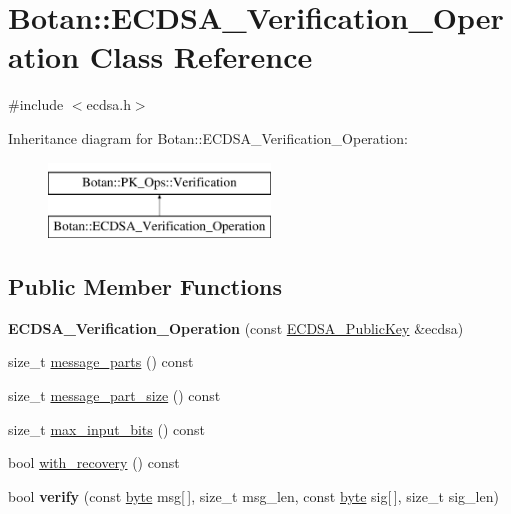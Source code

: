 \hypertarget{classBotan_1_1ECDSA__Verification__Operation}{\section{Botan\-:\-:E\-C\-D\-S\-A\-\_\-\-Verification\-\_\-\-Operation Class Reference}
\label{classBotan_1_1ECDSA__Verification__Operation}
}


{\ttfamily \#include $<$ecdsa.\-h$>$}

Inheritance diagram for Botan\-:\-:E\-C\-D\-S\-A\-\_\-\-Verification\-\_\-\-Operation\-:\begin{figure}[H]
\begin{center}
\leavevmode
\includegraphics[height=2.000000cm]{classBotan_1_1ECDSA__Verification__Operation}
\end{center}
\end{figure}
\subsection*{Public Member Functions}
\begin{DoxyCompactItemize}
\item 
\hypertarget{classBotan_1_1ECDSA__Verification__Operation_a22b780c01456d689a6b8ae638fb13f1e}{{\bfseries E\-C\-D\-S\-A\-\_\-\-Verification\-\_\-\-Operation} (const \hyperlink{classBotan_1_1ECDSA__PublicKey}{E\-C\-D\-S\-A\-\_\-\-Public\-Key} \&ecdsa)}\label{classBotan_1_1ECDSA__Verification__Operation_a22b780c01456d689a6b8ae638fb13f1e}

\item 
size\-\_\-t \hyperlink{classBotan_1_1ECDSA__Verification__Operation_a4f0390fbece6f779b5a77665dc192a29}{message\-\_\-parts} () const 
\item 
size\-\_\-t \hyperlink{classBotan_1_1ECDSA__Verification__Operation_a88b21eb411dd51488e0b3897ad6cbc6a}{message\-\_\-part\-\_\-size} () const 
\item 
size\-\_\-t \hyperlink{classBotan_1_1ECDSA__Verification__Operation_a096072381914f2c74d13214ed6717c31}{max\-\_\-input\-\_\-bits} () const 
\item 
bool \hyperlink{classBotan_1_1ECDSA__Verification__Operation_a70a138a02196c862fb25f57c94cc7029}{with\-\_\-recovery} () const 
\item 
\hypertarget{classBotan_1_1ECDSA__Verification__Operation_a7ab5f54ce955a4b449680a7345ee190e}{bool {\bfseries verify} (const \hyperlink{namespaceBotan_a7d793989d801281df48c6b19616b8b84}{byte} msg\mbox{[}$\,$\mbox{]}, size\-\_\-t msg\-\_\-len, const \hyperlink{namespaceBotan_a7d793989d801281df48c6b19616b8b84}{byte} sig\mbox{[}$\,$\mbox{]}, size\-\_\-t sig\-\_\-len)}\label{classBotan_1_1ECDSA__Verification__Operation_a7ab5f54ce955a4b449680a7345ee190e}

\end{DoxyCompactItemize}


